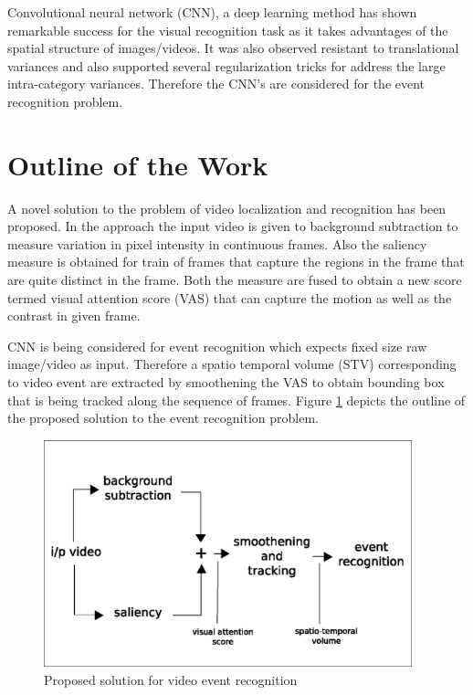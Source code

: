 \par Convolutional neural network (CNN), a deep learning method has shown remarkable success for the visual recognition task as it takes advantages of the spatial structure of images/videos. It was
also observed resistant to translational variances and also supported several regularization tricks for address the large intra-category variances. Therefore the CNN's are considered for  the event recognition problem.

\clearpage
\section{Outline of the Work}
A novel solution to the problem of video localization and recognition has been proposed. In the approach the input video is given to background subtraction to measure variation in pixel intensity in continuous frames. Also the saliency measure is obtained for train of frames that capture the regions in the frame that are quite distinct in the frame. Both the measure are fused to obtain a new score termed visual attention score (VAS) that can capture the motion as well as the contrast in given frame. 
\par CNN is being considered for event recognition  which expects fixed size raw image/video as input. Therefore a spatio temporal volume (STV) corresponding to video event are extracted by smoothening the VAS to obtain bounding box that is being tracked along the sequence of frames. Figure \ref{fig:outline} depicts the outline of the proposed solution to the event recognition problem.
\begin{figure}[htpb]
   \begin{center}
	    \includegraphics[width=0.95\textwidth]{snaps/outline.eps}     
     \caption {Proposed solution for video event recognition}
   \label{fig:outline}
   \end{center}
 \end{figure}
 
